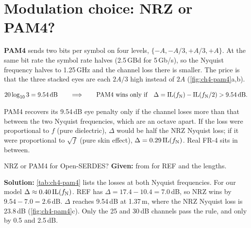 \section{Modulation choice: NRZ or PAM4?}\label{sec:pam4}

\textbf{PAM4} sends two bits per symbol on four levels, $\{-A, -A/3, +A/3, +A\}$. At the same bit rate the symbol rate halves (2.5\,GBd for 5\,Gb/s), so the Nyquist frequency halves to 1.25\,GHz and the channel loss there is smaller. The price is that the three stacked eyes are each $2A/3$ high instead of $2A$ (\cref{fig:ch4-pam4}a,b).

\begin{keyeq}
\begin{equation}
  20\log_{10}3 = 9.54\,\mathrm{dB}
  \qquad\Longrightarrow\qquad
  \text{PAM4 wins only if}\quad \Delta = \mathrm{IL}(f_\mathrm{N}) - \mathrm{IL}(f_\mathrm{N}/2) > 9.54\,\mathrm{dB}.
  \label{eq:ch4-pam4}
\end{equation}
\end{keyeq}
PAM4 recovers its 9.54\,dB eye penalty only if the channel loses more than that between the two Nyquist frequencies, which are an octave apart. If the loss were proportional to $f$ (pure dielectric), $\Delta$ would be half the NRZ Nyquist loss; if it were proportional to $\sqrt f$ (pure skin effect), $\Delta = 0.29\,\mathrm{IL}(f_\mathrm{N})$. Real FR-4 sits in between.

\begin{example}{NRZ or PAM4 for Open-SERDES?}\label{we:ch4-pam4}
\textbf{Given:}  from  for REF and the  lengths.

\textbf{Solution:} \cref{tab:ch4-pam4} lists the losses at both Nyquist frequencies. For our model $\Delta \approx 0.40\,\mathrm{IL}(f_\mathrm{N})$. REF has $\Delta = 17.4 - 10.4 = 7.0$\,dB, so NRZ wins by $9.54 - 7.0 = 2.6$\,dB. $\Delta$ reaches 9.54\,dB at 1.37\,m, where the NRZ Nyquist loss is 23.8\,dB (\cref{fig:ch4-pam4}c). Only the 25 and 30\,dB channels pass the rule, and only by 0.5 and 2.5\,dB.
\end{example}

